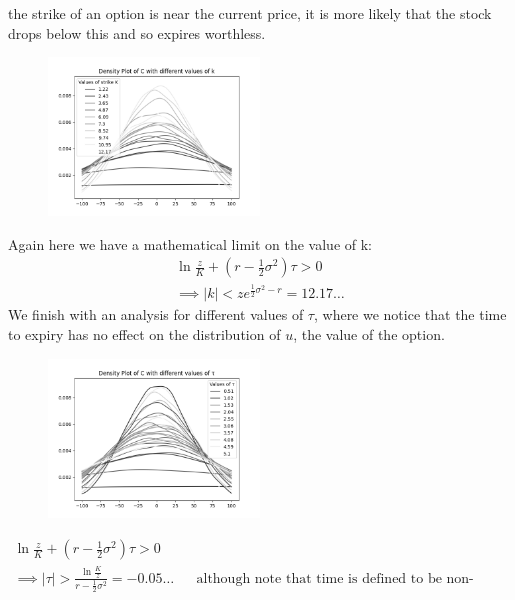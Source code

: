 \documentclass[11pt]{article} %
\begin{document}
the strike of an option is near the current price, it is more likely that 
the stock drops below this and so expires worthless.
\begin{figure}[h] 
    \centering
    \includegraphics[width=0.5\textwidth]{kvalue.png} 
    \caption[]{}\label{kvalue}
\end{figure}
Again here we have a mathematical limit on the value of k:
\begin{align}
    \ln{\frac{z}{K}} + (r - \frac{1}{2} \sigma^2)\tau > 0 \\
    \implies |k| < ze^{\frac{1}{2}\sigma^2 - r} = 12.17\dots
\end{align}
We finish with an analysis for different values of $\tau$, where we notice that 
the time to expiry has no effect on the distribution of $u$, the value of the 
option.
\begin{figure}[h] 
    \centering
    \includegraphics[width=0.5\textwidth]{tauvalue.png} 
    \caption[]{}\label{tauvalue}
\end{figure}
\begin{align}
    \ln{\frac{z}{K}} + (r - \frac{1}{2} \sigma^2)\tau > 0 \\
    \implies |\tau| > \frac{\ln{\frac{K}{z}}}{r - \frac{1}{2}\sigma^2} 
    = -0.05\dots&& \text{although note that time is 
    defined to be non-negative.}
\end{align}
\end{document}
